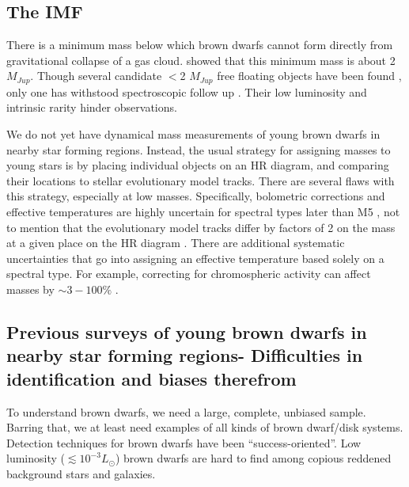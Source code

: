 \subsection{The IMF}

There is a minimum mass below which brown dwarfs cannot form directly from gravitational collapse of a gas cloud.  \citet{1976MNRAS.176..483R} showed that this minimum mass is about 2 $M_{Jup}$.  Though several candidate $<$2 $M_{Jup}$ free floating objects have been found \citep{2015A&A...574A.118P}, only one has withstood spectroscopic follow up \citep{2010ApJ...709L.158M}.  Their low luminosity and intrinsic rarity hinder observations.

We do not yet have dynamical mass measurements of young brown dwarfs in nearby star forming regions.  Instead, the usual strategy for assigning masses to young stars is by placing individual objects on an HR diagram, and comparing their locations to stellar evolutionary model tracks.  There are several flaws with this strategy, especially at low masses.  Specifically, bolometric corrections and effective temperatures are highly uncertain for spectral types later than M5 \citep{2013ApJS..208....9P}, not to mention that the evolutionary model tracks differ by factors of 2 on the mass at a given place on the HR diagram \citep{1994ApJS...90..467D,1998A&A...337..403B}.  There are additional systematic uncertainties that go into assigning an effective temperature based solely on a spectral type.  For example, correcting for chromospheric activity can affect masses by $\sim3-100\%$ \citep{2014ApJ...796..119S}.

\subsection{Previous surveys of young brown dwarfs in nearby star forming regions- Difficulties in identification and biases therefrom}

To understand brown dwarfs, we need a large, complete, unbiased sample.  Barring that, we at least need examples of all kinds of brown dwarf/disk systems.  Detection techniques for brown dwarfs have been ``success-oriented''.  Low luminosity ($\lesssim10^{-3}L_{\odot}$) brown dwarfs are hard to find among copious reddened background stars and galaxies.

